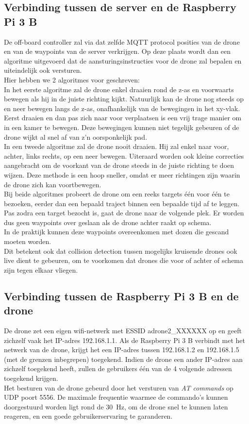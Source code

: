 \subsection{Verbinding tussen de server en de Raspberry Pi 3 B} \label{sec:server_raspberry}
De off-board controller zal via dat zelfde MQTT protocol posities van de drone en van de waypoints van de server verkrijgen.
Op deze plaats wordt dan een algoritme uitgevoerd dat de aansturingsinstructies voor de drone zal bepalen en uiteindelijk ook versturen.\\

Hier hebben we 2 algoritmes voor geschreven:\\
In het eerste algoritme zal de drone enkel draaien rond de z-as en voorwaarts bewegen als hij in de juiste richting kijkt.
Natuurlijk kan de drone nog steeds op en neer bewegen langs de z-as, onafhankelijk van de bewegingen in het xy-vlak.
Eerst draaien en dan pas zich naar voor verplaatsen is een vrij trage manier om in een kamer te bewegen.
Deze bewegingen kunnen niet tegelijk gebeuren of de drone wijkt al snel af van z'n oorsponkelijk pad.\\
In een tweede algoritme zal de drone nooit draaien.
Hij zal enkel naar voor, achter, links rechts, op een neer bewegen.
Uiteraard worden ook kleine correcties aangebracht om de voorkant van de drone steeds in de juiste richting te doen wijzen.
Deze methode is een hoop sneller, omdat er meer richtingen zijn waarin de drone zich kan voortbewegen.\\

Bij beide algoritmes probeert de drone om een reeks targets \'e\'en voor \'e\'en te bezoeken, eerder dan een bepaald traject binnen een bepaalde tijd af te leggen.
Pas zodra een target bezocht is, gaat de drone naar de volgende plek.
Er worden dus geen waypoints over geslaan als de drone achter raakt op schema.\\
In de praktijk kunnen deze waypoints overeenkomen met dozen die gescand moeten worden.\\
Dit betekent ook dat collision detection tussen mogelijks kruisende drones ook live dient te gebeuren, om te voorkomen dat drones die voor of achter of schema zijn tegen elkaar vliegen.

\subsection{Verbinding tussen de Raspberry Pi 3 B en de drone} \label{sec:raspberry_drone}
De drone zet een eigen wifi-netwerk met ESSID adrone2\_XXXXXX  op en geeft zichzelf vaak het IP-adres 192.168.1.1.
Als de Raspberry Pi 3 B verbindt met het netwerk van de drone, krijgt het een IP-adres tussen 192.168.1.2 en 192.168.1.5 (met de grenzen inbegrepen) toegekend.
Indien de drone een ander IP-adres aan zichzelf toegekend heeft, zullen de gebruikers één van de 4 volgende adressen toegekend krijgen.\\
Het besturen van de drone gebeurd door het versturen van \textit{AT commands} op UDP poort 5556.
De maximale frequentie waarmee de commando's kunnen doorgestuurd worden ligt rond de \SI{30}{\Hz}, om de drone snel te kunnen laten reageren, en een goede gebruikerservaring te garanderen.\\ 

